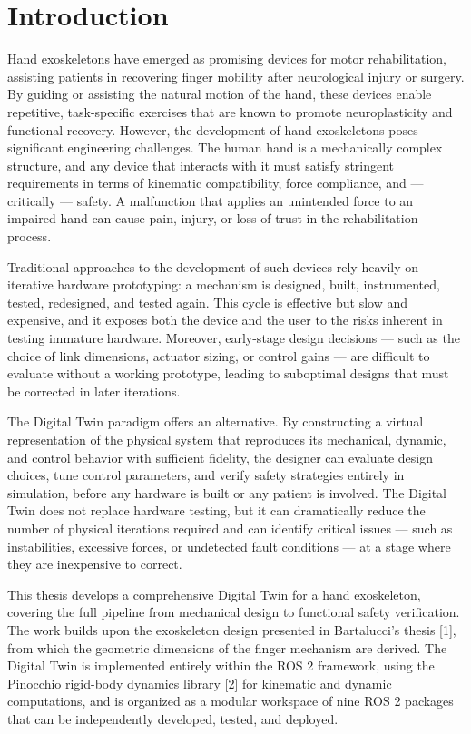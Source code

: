 \chapter*{Introduction}
Hand exoskeletons have emerged as promising devices for motor rehabilitation, assisting patients in recovering finger mobility after neurological injury or surgery. By guiding or assisting the natural motion of the hand, these devices enable repetitive, task-specific exercises that are known to promote neuroplasticity and functional recovery. However, the development of hand exoskeletons poses significant engineering challenges. The human hand is a mechanically complex structure, and any device that interacts with it must satisfy stringent requirements in terms of kinematic compatibility, force compliance, and — critically — safety. A malfunction that applies an unintended force to an impaired hand can cause pain, injury, or loss of trust in the rehabilitation process.
 
Traditional approaches to the development of such devices rely heavily on iterative hardware prototyping: a mechanism is designed, built, instrumented, tested, redesigned, and tested again. This cycle is effective but slow and expensive, and it exposes both the device and the user to the risks inherent in testing immature hardware. Moreover, early-stage design decisions — such as the choice of link dimensions, actuator sizing, or control gains — are difficult to evaluate without a working prototype, leading to suboptimal designs that must be corrected in later iterations.
 
The Digital Twin paradigm offers an alternative. By constructing a virtual representation of the physical system that reproduces its mechanical, dynamic, and control behavior with sufficient fidelity, the designer can evaluate design choices, tune control parameters, and verify safety strategies entirely in simulation, before any hardware is built or any patient is involved. The Digital Twin does not replace hardware testing, but it can dramatically reduce the number of physical iterations required and can identify critical issues — such as instabilities, excessive forces, or undetected fault conditions — at a stage where they are inexpensive to correct.
 
This thesis develops a comprehensive Digital Twin for a hand exoskeleton, covering the full pipeline from mechanical design to functional safety verification. The work builds upon the exoskeleton design presented in Bartalucci's thesis [1], from which the geometric dimensions of the finger mechanism are derived. The Digital Twin is implemented entirely within the ROS 2 framework, using the Pinocchio rigid-body dynamics library [2] for kinematic and dynamic computations, and is organized as a modular workspace of nine ROS 2 packages that can be independently developed, tested, and deployed.
 
